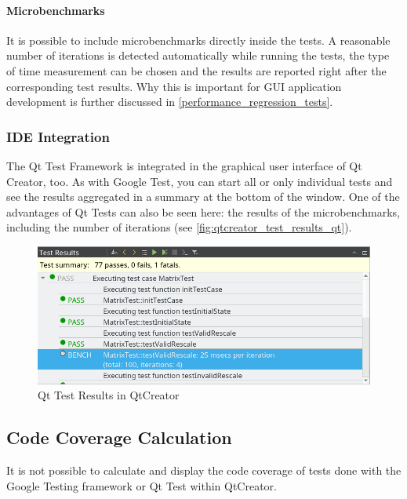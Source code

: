 \documentclass{scrreprt}
\begin{document}
\paragraph{Microbenchmarks}

It is possible to include microbenchmarks directly inside the tests. A reasonable number of iterations is detected automatically while running the tests, the type of time measurement can be chosen and the results are reported right after the corresponding test results. Why this is important for GUI application development is further discussed in \vref{performance_regression_tests}.


\subsubsection{IDE Integration}

The Qt Test Framework is integrated in the graphical user interface of Qt Creator, too. As with Google Test, you can start all or only individual tests and see the results aggregated in a summary at the bottom of the window. One of the advantages of Qt Tests can also be seen here: the results of the microbenchmarks, including the number of iterations (see \vref{fig:qtcreator_test_results_qt}).

\begin{figure}[h]
	\centering
	\includegraphics[width=1.0\textwidth]{img/qtcreator_test_results_qt}
	\caption[QtCreator Qt Test Results]{Qt Test Results in QtCreator}
	\label{fig:qtcreator_test_results_qt}
\end{figure}


\subsection{Code Coverage Calculation}

It is not possible to calculate and display the code coverage of tests done with the Google Testing framework or Qt Test within QtCreator.
\end{document}

